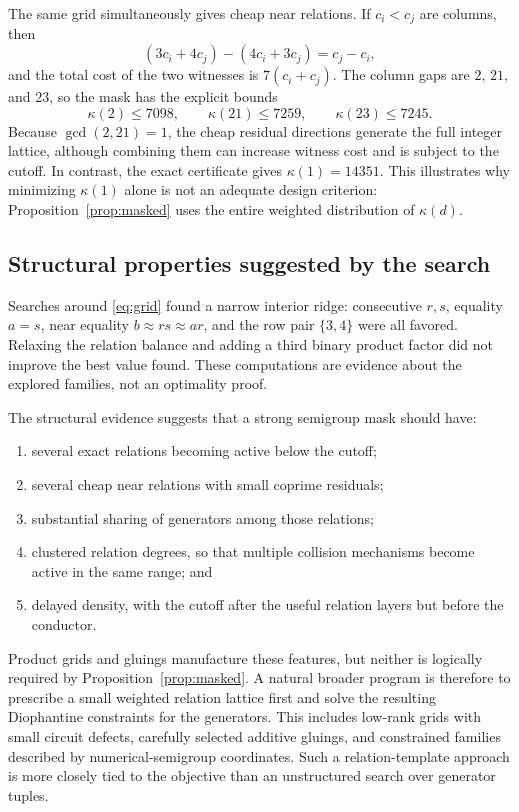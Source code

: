 \documentclass[11pt]{article}
\begin{document}
The same grid simultaneously gives cheap near relations.  If
$c_i<c_j$ are columns, then
\begin{equation}\label{eq:grid-residual}
 (3c_i+4c_j)-(4c_i+3c_j)=c_j-c_i,
\end{equation}
and the total cost of the two witnesses is $7(c_i+c_j)$.  The column gaps
are $2$, $21$, and $23$, so the mask has the explicit bounds
\[
 \kappa(2)\le7098,\qquad
 \kappa(21)\le7259,\qquad
 \kappa(23)\le7245.
\]
Because $\gcd(2,21)=1$, the cheap residual directions generate the full
integer lattice, although combining them can increase witness cost and is
subject to the cutoff.  In contrast, the exact certificate gives
$\kappa(1)=14351$.  This illustrates why minimizing $\kappa(1)$ alone is
not an adequate design criterion: Proposition~\ref{prop:masked} uses the
entire weighted distribution of $\kappa(d)$.

\subsection{Structural properties suggested by the search}
Searches around \eqref{eq:grid} found a narrow interior ridge: consecutive
$r,s$, equality $a=s$, near equality $b\approx rs\approx ar$, and the row
pair $\{3,4\}$ were all favored.  Relaxing the relation balance and adding
a third binary product factor did not improve the best value found.  These
computations are evidence about the explored families, not an optimality
proof.

The structural evidence suggests that a strong semigroup mask should have:
\begin{enumerate}
 \item several exact relations becoming active below the cutoff;
 \item several cheap near relations with small coprime residuals;
 \item substantial sharing of generators among those relations;
 \item clustered relation degrees, so that multiple collision mechanisms
       become active in the same range; and
 \item delayed density, with the cutoff after the useful relation layers
       but before the conductor.
\end{enumerate}
Product grids and gluings manufacture these features, but neither is
logically required by Proposition~\ref{prop:masked}.  A natural broader
program is therefore to prescribe a small weighted relation lattice first
and solve the resulting Diophantine constraints for the generators.  This
includes low-rank grids with small circuit defects, carefully selected
additive gluings, and constrained families described by numerical-semigroup
coordinates.  Such a
relation-template approach is more closely tied to the objective than an
unstructured search over generator tuples.
\end{document}
